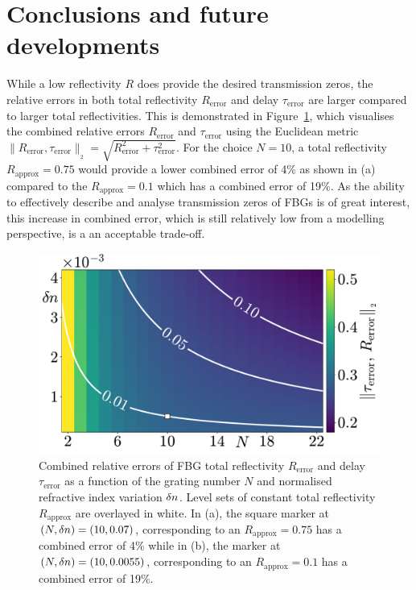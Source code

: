 \section*{Conclusions and future developments}
\label{sec:conclusions}
%
While a low reflectivity $R$ does provide the desired transmission zeros, the relative errors in both total reflectivity $R_\text{error}$ and delay $\tau_\text{error}$ are larger compared to larger total reflectivities. 
This is demonstrated in Figure~\ref{fig:NR_Selection}, which visualises the combined relative errors $R_\text{error}$ and $\tau_\text{error}$ using the Euclidean metric $\| R_\text{error}, \tau_\text{error} \|_{_2} = \sqrt{R_\text{error}^2 + \tau_\text{error}^2}$. 
For the choice $N=10$, a total reflectivity $R_\text{approx} = 0.75$ would provide a lower combined error of 4\% as shown in (a) compared to the $R_\text{approx} = 0.1$ which has a combined error of 19\%. 
As the ability to effectively describe and analyse transmission zeros of FBGs is of great interest, this increase in combined error, which is still relatively low from a modelling perspective, is a an acceptable trade-off.
%
\begin{figure}
    \centering
    
    \includegraphics[width=0.95\linewidth]{Images/NR_Selection.pdf}
    
    \caption{Combined relative errors of FBG total reflectivity $R_\text{error}$ and delay $\tau_\text{error}$ as a function of the grating number $N$ and normalised refractive index variation $\delta n$. 
    Level sets of constant total reflectivity $R_\text{approx}$ are overlayed in white. 
    In (a), the square marker at $(N,\delta n) = (10, 0.07)$, corresponding to an $R_\text{approx} = 0.75$ has a combined error of 4\% while in (b), the marker at $(N,\delta n) = (10, 0.0055)$, 
    corresponding to an $R_\text{approx} = 0.1$ has a combined error of 19\%.}
    
    \label{fig:NR_Selection}
\end{figure}
%